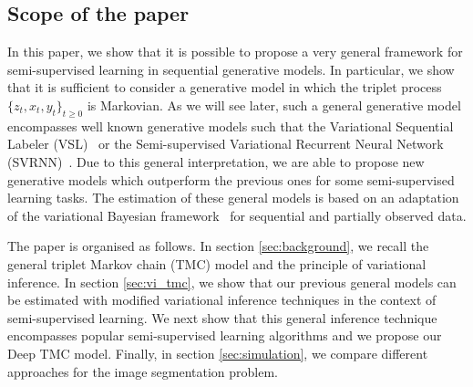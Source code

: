 \documentclass{article}
\def\x{{\mathbf x}}
\def\z{{\mathbf z}}
\def\p{p_{\theta}}
\newcommand{\katy}[1]{\todo[inline,color=pink]{#1 --- Katy}}
\begin{document}





\subsection{Scope of the paper}
In this paper, we show that it is possible 
to propose a very general framework 
for semi-supervised learning in sequential generative 
models. In particular, we show that it is sufficient
to consider a generative model in which 
the triplet process $\{z_t,x_t,y_t\}_{t \geq 0}$ is Markovian.
As we will see later, such a general generative
model encompasses well known generative
models such that the Variational Sequential Labeler 
(VSL)~\cite{chen2019variational} or the Semi-supervised Variational Recurrent Neural Network (SVRNN)~\cite{butepage2019predicting}. Due to this general interpretation, 
we are able to propose new generative models which outperform
the previous ones for some semi-supervised learning tasks. The estimation 
of these general models is based on an adaptation of the
variational Bayesian framework~\cite{Jordan99anintroduction} for sequential and partially 
observed data.

The paper is organised as follows. In section \ref{sec:background}, we
recall the general triplet Markov chain (TMC) model \cite{wp-cras-chaines3,pieczynski2005triplet} and the principle of variational inference. In section \ref{sec:vi_tmc}, we show that our previous general models can be estimated with modified variational inference techniques in the context of semi-supervised learning. We next show that this general inference technique encompasses popular semi-supervised learning algorithms and we propose our Deep TMC 
model. Finally, in section \ref{sec:simulation}, we compare different approaches for the image segmentation problem. %
\end{document}
